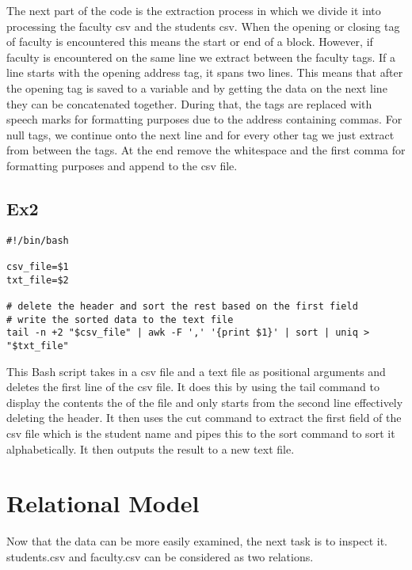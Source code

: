 \documentclass[12pt]{article}
\begin{document}
The next part of the code is the extraction process in which we divide it into processing the faculty csv and the students csv. When the opening or closing tag of faculty is encountered this means the start or end of a block. However, if faculty is encountered on the same line we extract between the faculty tags. If a line starts with the opening address tag, it spans two lines. This means that after the opening tag is saved to a variable and by getting the data on the next line they can be concatenated together. During that, the tags are replaced with speech marks for formatting purposes due to the address containing commas. For null tags, we continue onto the next line and for every other tag we just extract from between the tags. At the end remove the whitespace and the first comma for formatting purposes and append to the csv file.
\subsection{Ex2}
\begin{tcolorbox}[
    enhanced,
    attach boxed title to top left={xshift=6mm,yshift=-3mm},
    colback=lightgreen!20,
    colframe=lightgreen,
    colbacktitle=lightgreen,
    title=Bash Script,
    fonttitle=\bfseries\color{black},
    boxed title style={size=small,colframe=lightgreen,sharp corners},
    sharp corners,
]
\begin{verbatim}
#!/bin/bash

csv_file=$1
txt_file=$2

# delete the header and sort the rest based on the first field
# write the sorted data to the text file
tail -n +2 "$csv_file" | awk -F ',' '{print $1}' | sort | uniq > "$txt_file"
\end{verbatim}
\end{tcolorbox}
This Bash script takes in a csv file and a text file as positional arguments and deletes the first line of the csv file. It does this by using the tail command to display the contents the of the file and only starts from the second line effectively deleting the header. It then uses the cut command to extract the first field of the csv file which is the student name and pipes this to the sort command to sort it alphabetically. It then outputs the result to a new text file. 
\section{Relational Model}
Now that the data can be more easily examined, the next task is to inspect it. students.csv and faculty.csv can be considered as two relations. 
\end{document}
